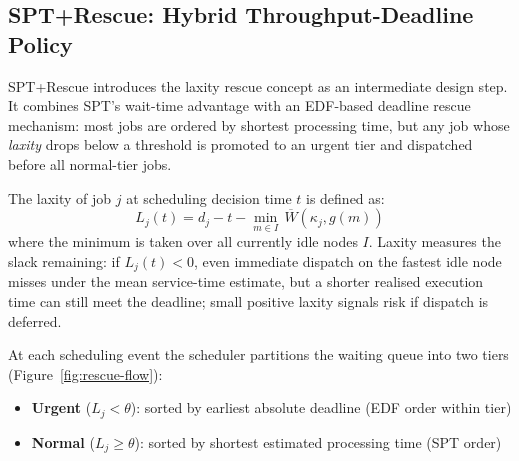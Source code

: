 \subsection{SPT+Rescue: Hybrid Throughput-Deadline Policy}
\label{ssec:spt-rescue-hybrid-throughput-deadline-policy}

SPT+Rescue introduces the laxity rescue concept as an intermediate design step. It combines SPT's wait-time advantage with an EDF-based deadline rescue mechanism: most jobs are ordered by shortest processing time, but any job whose \emph{laxity} drops below a threshold is promoted to an urgent tier and dispatched before all normal-tier jobs.

The laxity of job $j$ at scheduling decision time $t$ is defined as:
\begin{equation}
L_j(t) = d_j - t - \min_{m \in I}\, \overline{W}(\kappa_j, g(m))
\label{eq:laxity}
\end{equation}
where the minimum is taken over all currently idle nodes $I$. Laxity measures the slack remaining: if $L_j(t) < 0$, even immediate dispatch on the fastest idle node misses under the mean service-time estimate, but a shorter realised execution time can still meet the deadline; small positive laxity signals risk if dispatch is deferred.

At each scheduling event the scheduler partitions the waiting queue into two tiers (Figure~\ref{fig:rescue-flow}):
\begin{itemize}
  \item \textbf{Urgent} ($L_j < \theta$): sorted by earliest absolute deadline (EDF order within tier)
  \item \textbf{Normal} ($L_j \geq \theta$): sorted by shortest estimated processing time (SPT order)
\end{itemize}


